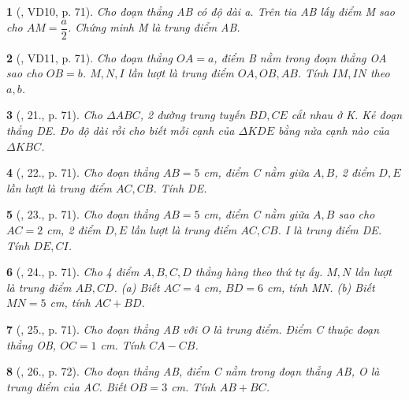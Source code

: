 \documentclass{article}
\newtheorem{baitoan}{}
\begin{document}
\begin{baitoan}[\cite{Binh_Toan_6_tap_2}, VD10, p. 71]
	Cho đoạn thẳng AB có độ dài a. Trên tia AB lấy điểm M sao cho $AM = \dfrac{a}{2}$. Chứng minh M là trung điểm AB.
\end{baitoan}

\begin{baitoan}[\cite{Binh_Toan_6_tap_2}, VD11, p. 71]
	Cho đoạn thẳng $OA = a$, điểm B nằm trong đoạn thẳng OA sao cho $OB = b$. $M,N,I$ lần lượt là trung điểm $OA,OB,AB$. Tính  $IM,IN$ theo $a,b$.
\end{baitoan}

\begin{baitoan}[\cite{Binh_Toan_6_tap_2}, 21., p. 71]
	Cho $\Delta ABC$, 2 đường trung tuyến $BD,CE$ cắt nhau ở K. Kẻ đoạn thẳng DE. Đo độ dài rồi cho biết mỗi cạnh của $\Delta KDE$ bằng nửa cạnh nào của $\Delta KBC$.
\end{baitoan}

\begin{baitoan}[\cite{Binh_Toan_6_tap_2}, 22., p. 71]
	Cho đoạn thẳng $AB = 5$ {\rm cm}, điểm C nằm giữa $A,B$, 2 điểm $D,E$ lần lượt là trung điểm $AC,CB$. Tính  DE.
\end{baitoan}

\begin{baitoan}[\cite{Binh_Toan_6_tap_2}, 23., p. 71]
	Cho đoạn thẳng $AB = 5$ {\rm cm}, điểm C nằm giữa $A,B$ sao cho $AC = 2$ {\rm cm}, 2 điểm $D,E$ lần lượt là trung điểm $AC,CB$. I là trung điểm DE. Tính  $DE,CI$.
\end{baitoan}

\begin{baitoan}[\cite{Binh_Toan_6_tap_2}, 24., p. 71]
	Cho 4 điểm $A,B,C,D$ thẳng hàng theo thứ tự ấy. $M,N$ lần lượt là trung điểm $AB,CD$. (a) Biết $AC = 4$ {\rm cm}, $BD = 6$ {\rm cm}, tính MN. (b) Biết $MN = 5$ {\rm cm}, tính $AC + BD$.
\end{baitoan}

\begin{baitoan}[\cite{Binh_Toan_6_tap_2}, 25., p. 71]
	Cho đoạn thẳng AB với O là trung điểm. Điểm C thuộc đoạn thẳng OB, $OC = 1$ {\rm cm}. Tính $CA - CB$.
\end{baitoan}

\begin{baitoan}[\cite{Binh_Toan_6_tap_2}, 26., p. 72]
	Cho đoạn thẳng AB, điểm C nằm trong đoạn thẳng AB, O là trung điểm của AC. Biết $OB = 3$ {\rm cm}. Tính $AB + BC$.
\end{baitoan}
\end{document}
